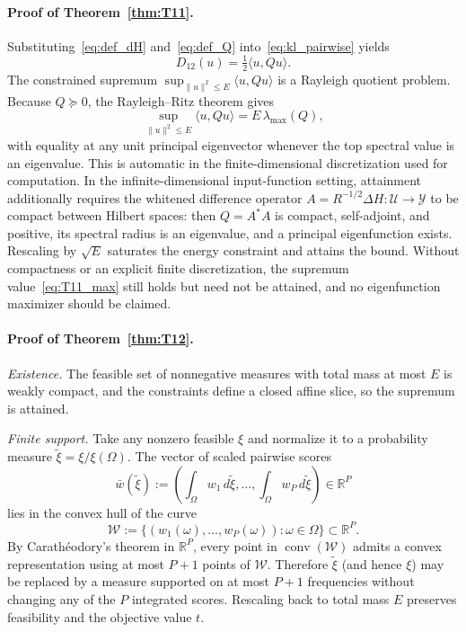 \paragraph{Proof of Theorem~\ref{thm:T11}.}
Substituting~\eqref{eq:def_dH} and~\eqref{eq:def_Q} into~\eqref{eq:kl_pairwise} yields
\[
D_{12}(u) = \tfrac{1}{2} \langle u, Q u \rangle.
\]
The constrained supremum \(\sup_{\|u\|^2 \le E} \langle u, Q u\rangle\) is a Rayleigh quotient problem. Because \(Q \succeq 0\), the Rayleigh--Ritz theorem gives
\[
\sup_{\|u\|^2 \le E} \langle u, Q u\rangle = E\,\lambda_{\max}(Q),
\]
with equality at any unit principal eigenvector whenever the top spectral value is an eigenvalue. This is automatic in the finite-dimensional discretization used for computation. In the infinite-dimensional input-function setting, attainment additionally requires the whitened difference operator \(A = R^{-1/2}\Delta H : \mathcal{U} \to \mathcal{Y}\) to be compact between Hilbert spaces: then \(Q = A^{*}A\) is compact, self-adjoint, and positive, its spectral radius is an eigenvalue, and a principal eigenfunction exists. Rescaling by \(\sqrt{E}\) saturates the energy constraint and attains the bound. Without compactness or an explicit finite discretization, the supremum value~\eqref{eq:T11_max} still holds but need not be attained, and no eigenfunction maximizer should be claimed.

\paragraph{Proof of Theorem~\ref{thm:T12}.}
\emph{Existence.} The feasible set of nonnegative measures with total mass at most \(E\) is weakly compact, and the constraints define a closed affine slice, so the supremum is attained.

\emph{Finite support.} Take any nonzero feasible \(\xi\) and normalize it to a probability measure \(\tilde\xi = \xi / \xi(\Omega)\). The vector of scaled pairwise scores
\[
\bar w(\tilde\xi) :=
\left( \int_{\Omega} w_1\, d\tilde\xi, \dots, \int_{\Omega} w_P\, d\tilde\xi \right)
\in \mathbb{R}^P
\]
lies in the convex hull of the curve
\[
\mathcal{W} := \big\{ (w_1(\omega), \dots, w_P(\omega)) : \omega \in \Omega \big\} \subset \mathbb{R}^P.
\]
By Carath\'eodory's theorem in \(\mathbb{R}^P\), every point in \(\operatorname{conv}(\mathcal{W})\) admits a convex representation using at most \(P+1\) points of \(\mathcal{W}\). Therefore \(\tilde\xi\) (and hence \(\xi\)) may be replaced by a measure supported on at most \(P+1\) frequencies without changing any of the \(P\) integrated scores. Rescaling back to total mass \(E\) preserves feasibility and the objective value \(t\).

